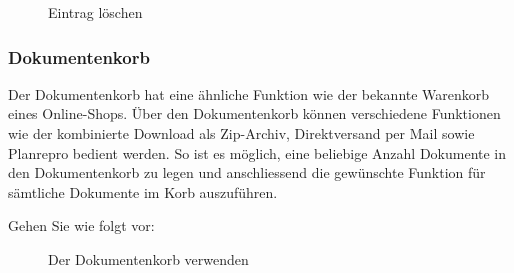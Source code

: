 \begin{figure}[H]
\caption{Eintrag löschen}
\end{figure}


\subsubsection{Dokumentenkorb}
\label{bkm:Ref201705445}

Der Dokumentenkorb hat eine ähnliche Funktion wie der bekannte Warenkorb eines Online-Shops. Über den Dokumentenkorb können verschiedene Funktionen wie der kombinierte Download als Zip-Archiv, Direktversand per Mail sowie Planrepro bedient werden. So ist es möglich, eine beliebige Anzahl Dokumente in den Dokumentenkorb zu legen und anschliessend die gewünschte Funktion für sämtliche Dokumente im Korb auszuführen.

\vspace{\baselineskip}

Gehen Sie wie folgt vor:

\begin{figure}[H]
\caption{Der Dokumentenkorb verwenden}
\end{figure}


